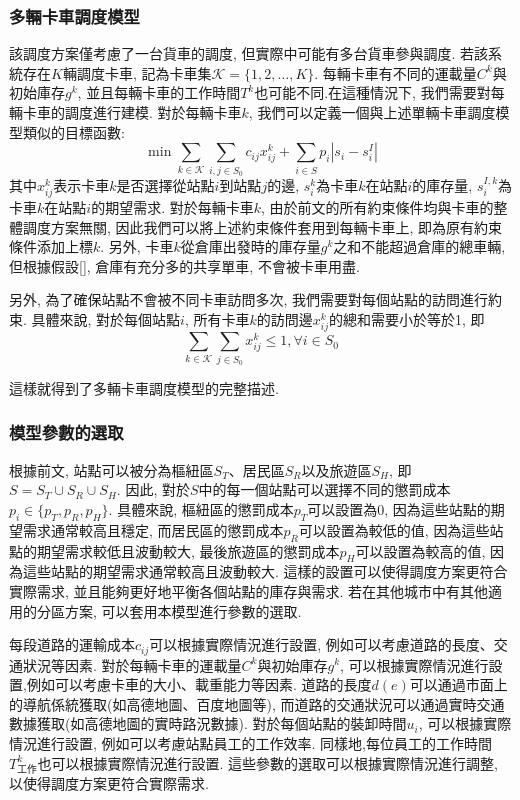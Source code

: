 \subsubsection{多輛卡車調度模型}
該調度方案僅考慮了一台貨車的調度, 但實際中可能有多台貨車參與調度. 若該系統存在\(K\)輛調度卡車, 記為卡車集\(\mathcal{K}=\{1,2,\dots,K\}\). 每輛卡車有不同的運載量\(C^k\)與初始庫存\(g^k\), 並且每輛卡車的工作時間\(T^k\)也可能不同.在這種情況下, 我們需要對每輛卡車的調度進行建模. 對於每輛卡車\(k\), 我們可以定義一個與上述單輛卡車調度模型類似的目標函數:
\begin{equation}
\min \sum_{k\in \mathcal{K}}\sum_{i,j\in S_0}c_{ij}x_{ij}^k + \sum_{i\in S}p_i|s_i - s_i^{I}|
\end{equation}
其中\(x_{ij}^k\)表示卡車\(k\)是否選擇從站點\(i\)到站點\(j\)的邊, \(s_i^k\)為卡車\(k\)在站點\(i\)的庫存量, \(s_i^{I,k}\)為卡車\(k\)在站點\(i\)的期望需求. 
對於每輛卡車\(k\), 由於前文的所有約束條件均與卡車的整體調度方案無關, 因此我們可以將上述約束條件套用到每輛卡車上, 即為原有約束條件添加上標\(k\). 另外, 卡車\(k\)從倉庫出發時的庫存量\(g^k\)之和不能超過倉庫的總車輛, 但根據{\color{red}\Large 假設[]}, 倉庫有充分多的共享單車, 不會被卡車用盡. 

另外, 為了確保站點不會被不同卡車訪問多次, 我們需要對每個站點的訪問進行約束. 具體來說, 對於每個站點\(i\), 所有卡車\(k\)的訪問邊\(x_{ij}^k\)的總和需要小於等於1, 即
\begin{equation}
\sum_{k\in \mathcal{K}}\sum_{j\in S_0}x_{ij}^k \leqslant 1, \forall i\in S_0
\end{equation}

這樣就得到了多輛卡車調度模型的完整描述.

\subsubsection{模型參數的選取}
根據前文, 站點可以被分為樞紐區\(S_T\)、居民區\(S_R\)以及旅遊區\(S_H\), 即\(S = S_T\cup S_R\cup S_H\). 因此, 對於\(S\)中的每一個站點可以選擇不同的懲罰成本\(p_i\in\{p_T, p_R, p_H\}\). 具體來說, 樞紐區的懲罰成本\(p_T\)可以設置為0, 因為這些站點的期望需求通常較高且穩定,
而居民區的懲罰成本\(p_R\)可以設置為較低的值, 因為這些站點的期望需求較低且波動較大, 最後旅遊區的懲罰成本\(p_H\)可以設置為較高的值, 因為這些站點的期望需求通常較高且波動較大. 這樣的設置可以使得調度方案更符合實際需求, 並且能夠更好地平衡各個站點的庫存與需求. 若在其他城市中有其他適用的分區方案, 可以套用本模型進行參數的選取.

每段道路的運輸成本\(c_{ij}\)可以根據實際情況進行設置, 例如可以考慮道路的長度、交通狀況等因素. 對於每輛卡車的運載量\(C^k\)與初始庫存\(g^k\), 可以根據實際情況進行設置,例如可以考慮卡車的大小、載重能力等因素. 道路的長度\(d(e)\)可以通過市面上的導航係統獲取(如高德地圖、百度地圖等), 而道路的交通狀況可以通過實時交通數據獲取(如高德地圖的實時路況數據).
對於每個站點的裝卸時間\(u_i\), 可以根據實際情況進行設置, 例如可以考慮站點員工的工作效率. 同樣地,每位員工的工作時間\(T_\text{工作}^k\)也可以根據實際情況進行設置. 這些參數的選取可以根據實際情況進行調整, 以使得調度方案更符合實際需求.

